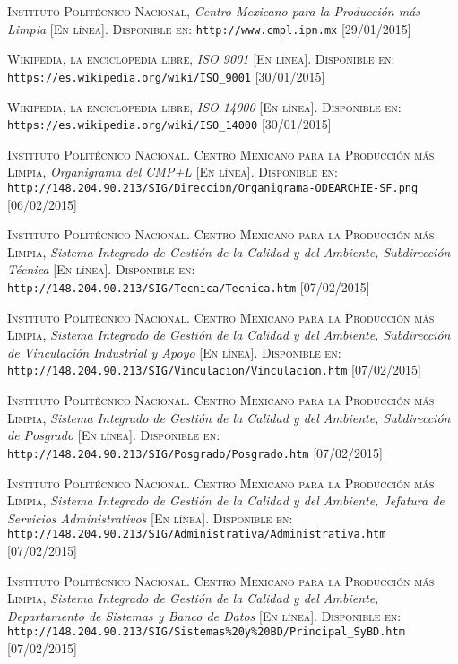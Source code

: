 \begin{thebibliography}{X}
		\textsc{Instituto Politécnico Nacional},
		\textit{Centro Mexicano para la Producción más Limpia}
		\textsc{[En línea]. Disponible en:}
		\texttt{http://www.cmpl.ipn.mx}
		\textsc{[29/01/2015]}
		
		\textsc{Wikipedia, la enciclopedia libre},
		\textit{ISO 9001}
		\textsc{[En línea]. Disponible en:}
		\texttt{https://es.wikipedia.org/wiki/ISO\_9001}
		\textsc{[30/01/2015]}
		
		\textsc{Wikipedia, la enciclopedia libre},
		\textit{ISO 14000}
		\textsc{[En línea]. Disponible en:}
		\texttt{https://es.wikipedia.org/wiki/ISO\_14000}
		\textsc{[30/01/2015]}
		
		\textsc{Instituto Politécnico Nacional. Centro Mexicano para la Producción más Limpia},
		\textit{Organigrama del CMP+L}
		\textsc{[En línea]. Disponible en:}
		\texttt{http://148.204.90.213/SIG/Direccion/Organigrama-ODEARCHIE-SF.png}
		\textsc{[06/02/2015]}
		
		\textsc{Instituto Politécnico Nacional. Centro Mexicano para la Producción más Limpia},
		\textit{Sistema Integrado de Gestión de la Calidad y del Ambiente, Subdirección Técnica}
		\textsc{[En línea]. Disponible en:}
		\texttt{http://148.204.90.213/SIG/Tecnica/Tecnica.htm}
		\textsc{[07/02/2015]}
	
		\textsc{Instituto Politécnico Nacional. Centro Mexicano para la Producción más Limpia},
		\textit{Sistema Integrado de Gestión de la Calidad y del Ambiente, Subdirección de Vinculación Industrial y Apoyo}
		\textsc{[En línea]. Disponible en:}
		\texttt{http://148.204.90.213/SIG/Vinculacion/Vinculacion.htm}
		\textsc{[07/02/2015]}
		
		\textsc{Instituto Politécnico Nacional. Centro Mexicano para la Producción más Limpia},
		\textit{Sistema Integrado de Gestión de la Calidad y del Ambiente, Subdirección de Posgrado}
		\textsc{[En línea]. Disponible en:}
		\texttt{http://148.204.90.213/SIG/Posgrado/Posgrado.htm}
		\textsc{[07/02/2015]}
		
		\textsc{Instituto Politécnico Nacional. Centro Mexicano para la Producción más Limpia},
		\textit{Sistema Integrado de Gestión de la Calidad y del Ambiente, Jefatura de Servicios Administrativos}
		\textsc{[En línea]. Disponible en:}
		\texttt{http://148.204.90.213/SIG/Administrativa/Administrativa.htm}
		\textsc{[07/02/2015]}
		
		\textsc{Instituto Politécnico Nacional. Centro Mexicano para la Producción más Limpia},
		\textit{Sistema Integrado de Gestión de la Calidad y del Ambiente, Departamento de Sistemas y Banco de Datos}
		\textsc{[En línea]. Disponible en:}
		\texttt{http://148.204.90.213/SIG/Sistemas\%20y\%20BD/Principal\_SyBD.htm}
		\textsc{[07/02/2015]}
		
\end{thebibliography}
